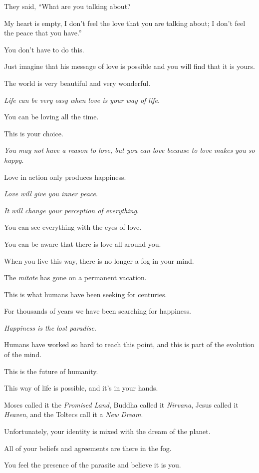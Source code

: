 \documentclass{article}
\numberwithin{equation}{section}
\begin{document}
They said, ``What are you talking about?

My heart is empty, I don't feel the love that you are talking about; I don't feel the peace that you have.''

You don't have to do this.

Just imagine that his message of love is possible and you will find that it is yours.

%
The world is very beautiful and very wonderful.

\textit{Life can be very easy when love is your way of life}.

You can be loving all the time.

This is your choice.

\textit{You may not have a reason to love, but you can love because to love makes you so happy}.

Love in action only produces happiness.

\textit{Love will give you inner peace}.

\textit{It will change your perception of everything}.

%
You can see everything with the eyes of love.

You can be aware that there is love all around you.

When you live this way, there is no longer a fog in your mind.

The \textit{mitote} has gone on a permanent vacation.

This is what humans have been seeking for centuries.

For thousands of years we have been searching for happiness.

\textit{Happiness is the lost paradise}.

Humans have worked so hard to reach this point, and this is part of the evolution of the mind.

This is the future of humanity.

%
This way of life is possible, and it's in your hands.

Moses called it the \textit{Promised Land}, Buddha called it \textit{Nirvana}, Jesus called it \textit{Heaven}, and the Toltecs call it a \textit{New Dream}.

Unfortunately, your identity is mixed with the dream of the planet.

All of your beliefs and agreements are there in the fog.

You feel the presence of the parasite and believe it is you.
\end{document}
